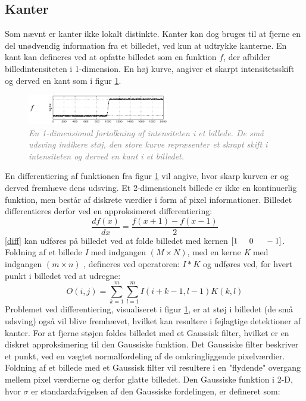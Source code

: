 \subsection{Kanter}\label{subsec:kant}
Som nævnt er kanter ikke lokalt distinkte. Kanter kan dog bruges til at fjerne en del unødvendig information fra et billedet, ved kun at udtrykke kanterne.  En kant kan defineres ved at opfatte billedet som en funktion $f$, der afbilder billedintensiteten i 1-dimension. En høj kurve, angiver et skarpt intensitetsskift og derved en kant som i figur \ref{fig:kant}.
\noindent
\begin{figure}[H]
    \centering
    \includegraphics[width=0.55\textwidth]{fig/7.png}
     \vspace{-1em}
    \begin{center}        
     \caption{\textcolor{gray}{\footnotesize \textit{
     En 1-dimensional fortolkning af intensiteten i et billede. De små udsving indikere støj, den store kurve repræsenter et skrapt skift i intensiteten og derved en kant i et billedet.}}}
    \label{fig:kant}
     \end{center}
       \vspace{-2.5em}
  \end{figure}
\noindent
En differentiering af funktionen fra figur \ref{fig:kant} vil angive, hvor skarp kurven er og derved fremhæve dens udsving. Et 2-dimensionelt billede er ikke en kontinuerlig funktion, men består af diskrete værdier i form af pixel informationer.
Billedet differentieres derfor ved en approksimeret differentiering: \begin{equation}
\dfrac{df(x)}{dx}=\dfrac{f(x+1)-f(x-1)}{2}
\label{diff}
\end{equation}
\eqref{diff} kan udføres på billedet ved at folde billedet med kernen $[1 \hspace{0.5cm} 0 \hspace{0.5cm} -1]$. Foldning af et billede \emph{I} med indgangen $(M \times N)$, med en kerne \emph{K} med indgangen $(m \times n)$ , defineres ved operatoren: $I\ast K$ og udføres ved, for hvert punkt i billedet ved at udregne:
\begin{equation}
O(i,j) = \sum\limits_{k=1}^m \sum\limits_{l=1}^m I(i+k-1,l-1)K(k,l)
\end{equation}
Problemet ved differentiering, visualiseret i figur \ref{fig:kant}, er at støj i billedet (de små udsving) også vil blive fremhævet, hvilket kan resultere i fejlagtige detektioner af kanter. For at fjerne støjen foldes billedet med et Gaussisk filter, hvilket er en diskret approksimering til den Gaussiske funktion. Det Gaussiske filter beskriver et punkt, ved en vægtet normalfordeling af de omkringliggende pixelværdier. Foldning af et billede med et Gaussisk filter vil resultere i en "flydende" overgang mellem pixel værdierne og derfor glatte billedet.  Den Gaussiske funktion i 2-D, hvor $ \sigma $ er standardafvigelsen af den Gaussiske fordelingen, er defineret som:
